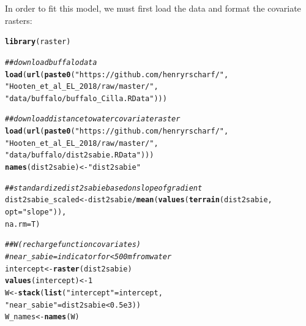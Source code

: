\documentclass[12pt]{article}\usepackage[]{graphicx}\usepackage[]{xcolor}
\makeatletter
\newcommand{\hlnum}[1]{\textcolor[rgb]{0.686,0.059,0.569}{#1}}%
\newcommand{\hlsng}[1]{\textcolor[rgb]{0.192,0.494,0.8}{#1}}%
\newcommand{\hlcom}[1]{\textcolor[rgb]{0.678,0.584,0.686}{\textit{#1}}}%
\newcommand{\hlopt}[1]{\textcolor[rgb]{0,0,0}{#1}}%
\newcommand{\hldef}[1]{\textcolor[rgb]{0.345,0.345,0.345}{#1}}%
\newcommand{\hlkwb}[1]{\textcolor[rgb]{0.69,0.353,0.396}{#1}}%
\newcommand{\hlkwc}[1]{\textcolor[rgb]{0.333,0.667,0.333}{#1}}%
\newcommand{\hlkwd}[1]{\textcolor[rgb]{0.737,0.353,0.396}{\textbf{#1}}}%
\newenvironment{kframe}{%
 \def\at@end@of@kframe{}%
 \ifinner\ifhmode%
  \def\at@end@of@kframe{\end{minipage}}%
  \begin{minipage}{\columnwidth}%
 \fi\fi%
 \def\FrameCommand##1{\hskip\@totalleftmargin \hskip-\fboxsep
 \colorbox{shadecolor}{##1}\hskip-\fboxsep
     \hskip-\linewidth \hskip-\@totalleftmargin \hskip\columnwidth}%
 \MakeFramed {\advance\hsize-\width
   \@totalleftmargin\z@ \linewidth\hsize
   \@setminipage}}%
 {\par\unskip\endMakeFramed%
 \at@end@of@kframe}
\newenvironment{knitrout}{}{} %
\makeatother
\begin{document}
In order to fit this model, we must first load the data and format the covariate rasters:
\begin{knitrout}
\color{fgcolor}\begin{kframe}
\begin{alltt}
\hlkwd{library}\hldef{(raster)}

\hlcom{## download buffalo data}
\hlkwd{load}\hldef{(}\hlkwd{url}\hldef{(}\hlkwd{paste0}\hldef{(}\hlsng{"https://github.com/henryrscharf/"}\hldef{,}
         \hlsng{"Hooten_et_al_EL_2018/raw/master/"}\hldef{,}
         \hlsng{"data/buffalo/buffalo_Cilla.RData"}\hldef{)))}

\hlcom{## download distance to water covariate raster}
\hlkwd{load}\hldef{(}\hlkwd{url}\hldef{(}\hlkwd{paste0}\hldef{(}\hlsng{"https://github.com/henryrscharf/"}\hldef{,}
                \hlsng{"Hooten_et_al_EL_2018/raw/master/"}\hldef{,}
                \hlsng{"data/buffalo/dist2sabie.RData"}\hldef{)))}
\hlkwd{names}\hldef{(dist2sabie)} \hlkwb{<-} \hlsng{"dist2sabie"}

\hlcom{## standardize dist2sabie based on slope of gradient}
\hldef{dist2sabie_scaled} \hlkwb{<-} \hldef{dist2sabie} \hlopt{/} \hlkwd{mean}\hldef{(}\hlkwd{values}\hldef{(}\hlkwd{terrain}\hldef{(dist2sabie,}
                                                      \hlkwc{opt} \hldef{=} \hlsng{"slope"}\hldef{)),}
                                       \hlkwc{na.rm} \hldef{= T)}

\hlcom{## W (recharge function covariates)}
\hlcom{# near_sabie = indicator for <500m from water}
\hldef{intercept} \hlkwb{<-} \hlkwd{raster}\hldef{(dist2sabie)}
\hlkwd{values}\hldef{(intercept)} \hlkwb{<-} \hlnum{1}
\hldef{W} \hlkwb{<-} \hlkwd{stack}\hldef{(}\hlkwd{list}\hldef{(}\hlsng{"intercept"} \hldef{= intercept,}
                \hlsng{"near_sabie"} \hldef{= dist2sabie} \hlopt{<} \hlnum{0.5e3}\hldef{))}
\hldef{W_names} \hlkwb{<-} \hlkwd{names}\hldef{(W)}


\end{alltt}
\end{kframe}
\end{knitrout}
\end{document}
